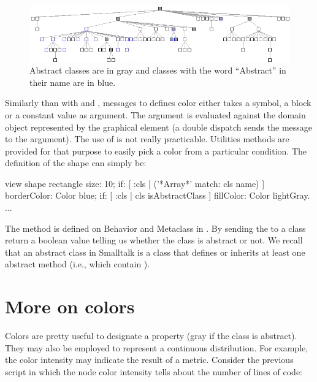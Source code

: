 \documentclass[a4paper,10pt,twoside]{book}
\begin{document}
\begin{figure}[htbp]
\centerline{\includegraphics[width=\linewidth]{abstractClasses}}
\caption{Abstract classes are in gray and classes with the word ``Abstract'' in their name are in blue.}
\label{fig:abstractClasses}
\end{figure}

Similarly than with  and , messages to defines color either takes a symbol, a block or a constant value as argument. The argument is evaluated against the domain object represented by the graphical element (a double dispatch sends the message  to the argument). 
The use of  is not really practicable. Utilities methods are provided for that purpose to easily pick a color from a particular condition. The definition of the shape can simply be:

\begin{code}{}
view shape rectangle
	size: 10;
	if: [ :cls | ('*Array*' match: cls name) ] borderColor: Color blue;
	if: [ :cls | cls isAbstractClass ] fillColor: Color lightGray.
...
\end{code}

The method  is defined on Behavior and Metaclass in \pharo. By sending the  to a class return a boolean value telling us whether the class is abstract or not. We recall that an abstract class in Smalltalk is a class that defines or inherits at least one  abstract method (i.e., which contain ).



\section{More on colors}

Colors are pretty useful to designate a property (\eg gray if the class is abstract). They may also be employed to represent a continuous distribution. For example, the color intensity may indicate the result of a metric. Consider the previous script in which the node color intensity tells about the number of lines of code:
\end{document}

